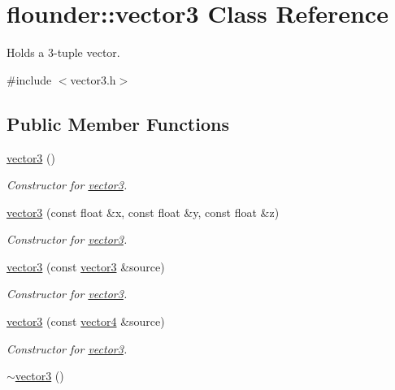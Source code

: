 \hypertarget{classflounder_1_1vector3}{}\section{flounder\+:\+:vector3 Class Reference}
\label{classflounder_1_1vector3}


Holds a 3-\/tuple vector.  




{\ttfamily \#include $<$vector3.\+h$>$}

\subsection*{Public Member Functions}
\begin{DoxyCompactItemize}
\item 
\hyperlink{classflounder_1_1vector3_a3b12a90a4b4350ccd42d7430b7c64fb8}{vector3} ()
\begin{DoxyCompactList}\small\item\em Constructor for \hyperlink{classflounder_1_1vector3}{vector3}. \end{DoxyCompactList}\item 
\hyperlink{classflounder_1_1vector3_a49b89a27fc3ec6d8ab67c786c5a3ca33}{vector3} (const float \&x, const float \&y, const float \&z)
\begin{DoxyCompactList}\small\item\em Constructor for \hyperlink{classflounder_1_1vector3}{vector3}. \end{DoxyCompactList}\item 
\hyperlink{classflounder_1_1vector3_afaeef6d77ae989f94054bcafe38ea890}{vector3} (const \hyperlink{classflounder_1_1vector3}{vector3} \&source)
\begin{DoxyCompactList}\small\item\em Constructor for \hyperlink{classflounder_1_1vector3}{vector3}. \end{DoxyCompactList}\item 
\hyperlink{classflounder_1_1vector3_a8ae4f086bb354ad64b918cce4eb0896c}{vector3} (const \hyperlink{classflounder_1_1vector4}{vector4} \&source)
\begin{DoxyCompactList}\small\item\em Constructor for \hyperlink{classflounder_1_1vector3}{vector3}. \end{DoxyCompactList}\item 
\hyperlink{classflounder_1_1vector3_aa14d036046bc573cba8a2001f4f2031b}{$\sim$vector3} ()

\end{DoxyCompactItemize}
